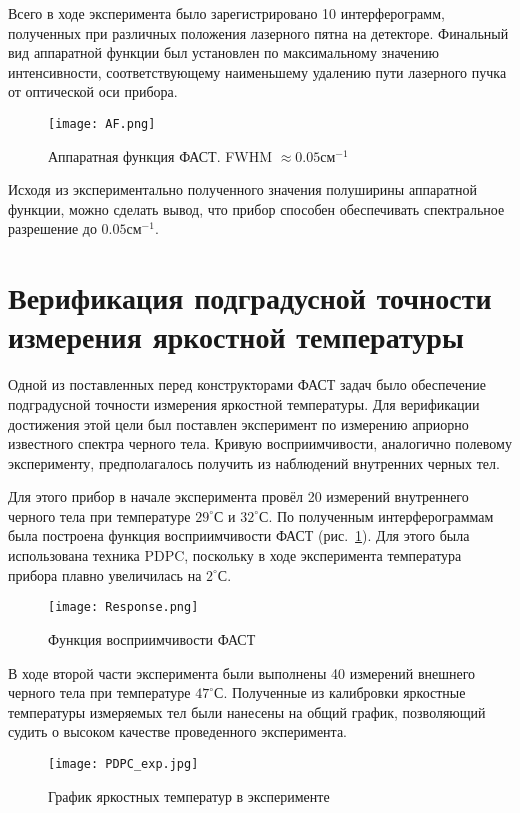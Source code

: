 \documentclass{mipt-thesis-bs}
\begin{document}
Всего в ходе эксперимента было зарегистрировано 10 интерферограмм, полученных при различных положения лазерного пятна на детекторе. Финальный вид аппаратной функции был установлен по максимальному значению интенсивности, соответствующему наименьшему удалению пути лазерного пучка от оптической оси прибора.

	\begin{figure}[h]
	\centering
	\texttt{[image: AF.png]}
	\caption{Аппаратная функция ФАСТ. FWHM $\approx 0.05 см^{-1}$}
\end{figure}

Исходя из экспериментально полученного значения полуширины аппаратной функции, можно сделать вывод, что прибор способен обеспечивать спектральное разрешение до $0.05 см^{-1}$. 

	\section{Верификация подградусной точности измерения яркостной температуры}
	Одной из поставленных перед конструкторами ФАСТ задач было обеспечение подградусной точности измерения яркостной температуры. Для верификации достижения этой цели был поставлен эксперимент по измерению априорно известного спектра черного тела. Кривую восприимчивости, аналогично полевому эксперименту, предполагалось получить из наблюдений внутренних черных тел.
	
	Для этого прибор в начале эксперимента провёл 20 измерений внутреннего черного тела при температуре $29^\circ С$ и $32^\circ С$. По полученным интерферограммам была построена функция восприимчивости ФАСТ (рис.~\ref{fig_FASTsuscept}). Для этого была использована техника PDPC, поскольку в ходе эксперимента температура прибора плавно увеличилась на $2^\circ С$.
	
   \begin{figure}[h!]
		\centering
		\texttt{[image: Response.png]}
		\caption{Функция восприимчивости ФАСТ}
		\label{fig_FASTsuscept}
	\end{figure}
	
	В ходе второй части эксперимента были выполнены 40 измерений внешнего черного тела при температуре $47^\circ С$. Полученные из калибровки яркостные температуры измеряемых тел были нанесены на общий график, позволяющий судить о высоком качестве проведенного эксперимента.
	
		\begin{figure}[h!]
		\centering
		\texttt{[image: PDPC\_exp.jpg]}
		\caption{График яркостных температур в эксперименте }
		\label{fig_brightexp}
	\end{figure}
	
\end{document}

